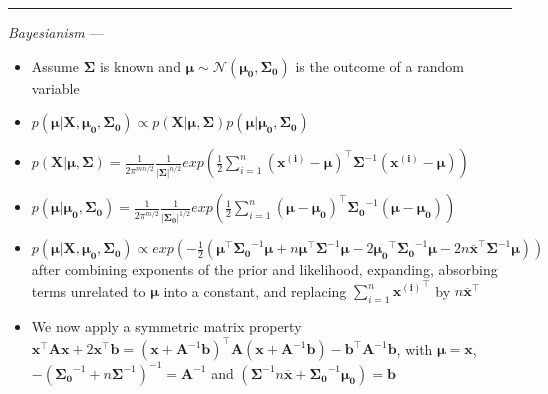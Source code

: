 {\color{lightgray}\hrule height 0.001mm}

\emph{Bayesianism} --- 
\begin{itemize}
    \item Assume $\boldsymbol{\Sigma}$ is known and $\boldsymbol{\mu} \sim \mathcal{N}(\boldsymbol{\mu_0}, \boldsymbol{\Sigma_0})$ is the outcome of a random variable
    \item $p(\boldsymbol{\mu} | \boldsymbol{X}, \boldsymbol{\mu_0}, \boldsymbol{\Sigma_0}) \propto p(\boldsymbol{X} | \boldsymbol{\mu}, \boldsymbol{\Sigma})p(\boldsymbol{\mu} | \boldsymbol{\mu_0}, \boldsymbol{\Sigma_0})$
    \item $p(\boldsymbol{X} | \boldsymbol{\mu}, \boldsymbol{\Sigma}) = \frac{1}{2\pi^{mn/2}} \frac{1}{|\boldsymbol{\Sigma}|^{n/2}} exp(\frac{1}{2} \sum_{i=1}^n ( \boldsymbol{\boldsymbol{x^{(i)}}} - \boldsymbol{\mu} )^\intercal \boldsymbol{\Sigma}^{-1} ( \boldsymbol{\boldsymbol{x^{(i)}}} - \boldsymbol{\mu} ) )$
    \item $p(\boldsymbol{\mu} | \boldsymbol{\mu_0}, \boldsymbol{\Sigma_0}) = \frac{1}{2\pi^{m/2}} \frac{1}{|\boldsymbol{\Sigma_0}|^{1/2}} exp(\frac{1}{2} \sum_{i=1}^n ( \boldsymbol{\mu} - \boldsymbol{\mu_0} )^\intercal \boldsymbol{\Sigma_0}^{-1} ( \boldsymbol{\mu} - \boldsymbol{\mu_0} ) )$
    \item $p(\boldsymbol{\mu} | \boldsymbol{X}, \boldsymbol{\mu_0}, \boldsymbol{\Sigma_0}) \propto exp( -\frac{1}{2} ( \boldsymbol{\mu}^\intercal \boldsymbol{\Sigma_0}^{-1} \boldsymbol{\mu} + n \boldsymbol{\mu}^\intercal \boldsymbol{\Sigma}^{-1} \boldsymbol{\mu} - 2 \boldsymbol{\mu_0}^\intercal \boldsymbol{\Sigma_0}^{-1} \boldsymbol{\mu} - 2 n \overline{\boldsymbol{x}}^\intercal \boldsymbol{\Sigma}^{-1} \boldsymbol{\mu} ) )$ after combining exponents of the prior and likelihood, expanding, absorbing terms unrelated to $\boldsymbol{\mu}$ into a constant, and replacing $\sum_{i=1}^n {\boldsymbol{x^{(i)}}}^\intercal$ by $n \overline{\boldsymbol{x}}^\intercal$
    \item We now apply a symmetric matrix property $\boldsymbol{x}^\intercal \boldsymbol{A} \boldsymbol{x} + 2 \boldsymbol{x}^\intercal \boldsymbol{b} = ( \boldsymbol{x} + \boldsymbol{A}^{-1} \boldsymbol{b} )^\intercal \boldsymbol{A} ( \boldsymbol{x} + \boldsymbol{A}^{-1} \boldsymbol{b} ) - \boldsymbol{b}^\intercal \boldsymbol{A}^{-1} \boldsymbol{b}$, with $\boldsymbol{\mu} = \boldsymbol{x}$, $-( \boldsymbol{\Sigma_0}^{-1} + n \boldsymbol{\Sigma}^{-1} )^{-1} = \boldsymbol{A}^{-1}$ and $(\boldsymbol{\Sigma}^{-1} n \overline{\boldsymbol{x}} + \boldsymbol{\Sigma_0}^{-1} \boldsymbol{\mu_0}) = \boldsymbol{b}$

\end{itemize}
